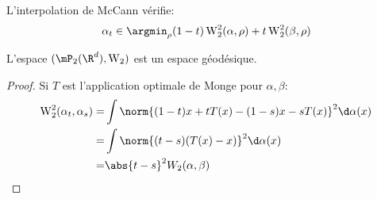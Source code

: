 \begin{proposition}
	L'interpolation de McCann vérifie:
	\begin{equation*}
		\alpha_{t}\in \argmin_{\rho} (1 - t)\Wass_{2}^{2}(\alpha, \rho) + t\Wass_{2}^{2}(\beta, \rho)
	\end{equation*}
\end{proposition}

\begin{proposition}
	L'espace $(\mP_{2}(\R^{d}), \Wass_{2})$ est un espace géodésique.
\end{proposition}
\begin{proof}
	Si $T$ est l'application optimale de Monge pour $\alpha, \beta$:
	\begin{align*}
		\Wass_{2}^{2}(\alpha_{t}, \alpha_{s}) = & \int \norm{(1-t)x + tT(x) - (1-s)x - sT(x)}^{2}\d \alpha(x) \\
		=                                       & \int\norm{(t - s)(T(x) - x)}^{2}\d\alpha(x)                 \\
		=                                       & \abs{t - s}^{2}W_{2}(\alpha, \beta)
	\end{align*}
\end{proof}
